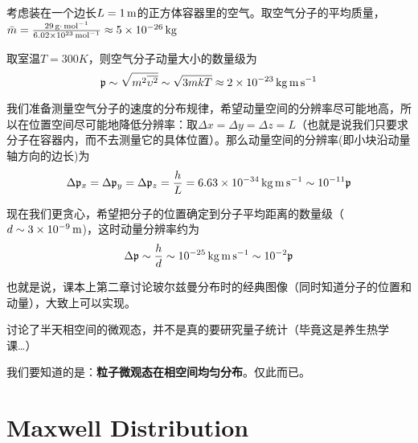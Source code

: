 \documentclass[CJK]{beamer}
\begin{document}
\begin{frame}
\bch
考虑装在一个边长$L= 1\,\mathrm{m}$的正方体容器里的空气。取空气分子的平均质量，$\bar{m} = \frac{29\,\mathrm{g}\cdot\,\mathrm{mol}^{-1}}{6.02\times 10^{23}\,\mathrm{mol}^{-1}}\approx 5 \times 10^{-26}\,\mathrm{kg}$

取室温$T=300K$，则空气分子动量大小的数量级为
$${\mathfrak{p}} \sim \sqrt{m^2\overline{\upsilon^2}} \sim \sqrt{3mkT} \approx 2\times 10^{-23} \,\mathrm{kg} \,\mathrm{m}\,\mathrm{s}^{-1} $$

我们准备测量空气分子的速度的分布规律，希望动量空间的分辨率尽可能地高，所以在位置空间尽可能地降低分辨率：取$\Delta x=\Delta y=\Delta z = L$（也就是说我们只要求分子在容器内，而不去测量它的具体位置）。那么动量空间的分辨率(即小块沿动量轴方向的边长)为
$$\Delta {\mathfrak{p}}_x = \Delta {\mathfrak{p}}_y = \Delta {\mathfrak{p}}_z= \frac{h}{L} = 6.63\times 10^{-34} \,\mathrm{kg}\,\mathrm{m}\,\mathrm{s}^{-1} \sim 10^{-11} {\mathfrak{p}}$$

\ech
\end{frame}


\begin{frame}
  \bch
  {\large
现在我们更贪心，希望把分子的位置确定到分子平均距离的数量级（$d\sim 3\times 10^{-9}\,\mathrm{m}$)，这时动量分辨率约为
$$\Delta {\mathfrak{p}} \sim \frac{h}{d} \sim 10^{-25} \,\mathrm{kg}\,\mathrm{m}\,\mathrm{s}^{-1} \sim 10^{-2} {\mathfrak{p}}$$

也就是说，课本上第二章讨论玻尔兹曼分布时的经典图像（同时知道分子的位置和动量），大致上可以实现。
}
\ech
\end{frame}


\begin{frame}
\bch
    {\large
      讨论了半天相空间的微观态，并不是真的要研究量子统计（毕竟这是养生热学课…）

      \skipline
      
      我们要知道的是：{\bf 粒子微观态在相空间均匀分布}。仅此而已。

}
\ech
\end{frame}


\section{Maxwell Distribution}

\end{document}
